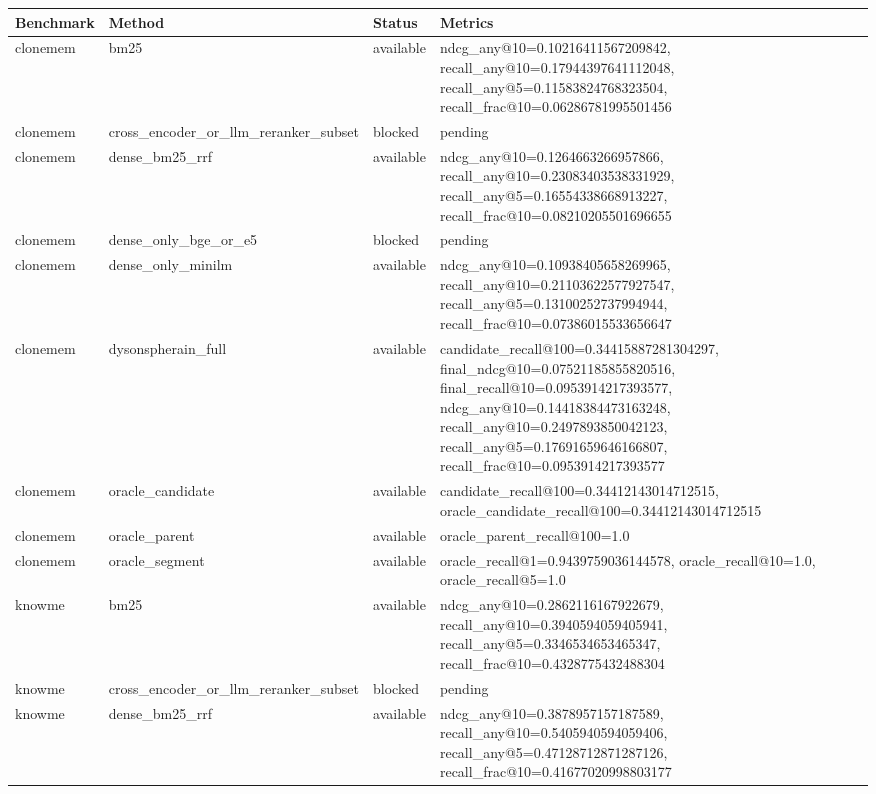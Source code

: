 \begin{tabular}{llll}
\toprule
Benchmark & Method & Status & Metrics \\
\midrule
clonemem & bm25 & available & ndcg_any@10=0.10216411567209842, recall_any@10=0.17944397641112048, recall_any@5=0.11583824768323504, recall_frac@10=0.06286781995501456 \\
clonemem & cross_encoder_or_llm_reranker_subset & blocked & pending \\
clonemem & dense_bm25_rrf & available & ndcg_any@10=0.1264663266957866, recall_any@10=0.23083403538331929, recall_any@5=0.16554338668913227, recall_frac@10=0.08210205501696655 \\
clonemem & dense_only_bge_or_e5 & blocked & pending \\
clonemem & dense_only_minilm & available & ndcg_any@10=0.10938405658269965, recall_any@10=0.21103622577927547, recall_any@5=0.13100252737994944, recall_frac@10=0.07386015533656647 \\
clonemem & dysonspherain_full & available & candidate_recall@100=0.34415887281304297, final_ndcg@10=0.07521185855820516, final_recall@10=0.0953914217393577, ndcg_any@10=0.14418384473163248, recall_any@10=0.2497893850042123, recall_any@5=0.17691659646166807, recall_frac@10=0.0953914217393577 \\
clonemem & oracle_candidate & available & candidate_recall@100=0.34412143014712515, oracle_candidate_recall@100=0.34412143014712515 \\
clonemem & oracle_parent & available & oracle_parent_recall@100=1.0 \\
clonemem & oracle_segment & available & oracle_recall@1=0.9439759036144578, oracle_recall@10=1.0, oracle_recall@5=1.0 \\
knowme & bm25 & available & ndcg_any@10=0.2862116167922679, recall_any@10=0.3940594059405941, recall_any@5=0.3346534653465347, recall_frac@10=0.4328775432488304 \\
knowme & cross_encoder_or_llm_reranker_subset & blocked & pending \\
knowme & dense_bm25_rrf & available & ndcg_any@10=0.3878957157187589, recall_any@10=0.5405940594059406, recall_any@5=0.47128712871287126, recall_frac@10=0.41677020998803177 \\

\end{tabular}
